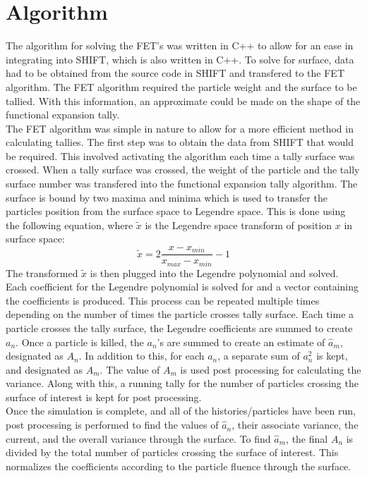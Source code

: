 \documentclass[10tma4paper]{article}
\begin{document}
\section{Algorithm}\label{algorith}
The algorithm for solving the FET's was written in C++ to allow for an ease in integrating into SHIFT, which is also written in C++. To solve for surface, data had to be obtained from the source code in SHIFT and transfered to the FET algorithm. The FET algorithm required the particle weight and the surface to be tallied. With this information, an approximate could be made on the shape of the functional expansion tally.
\\
The FET algorithm was simple in nature to allow for a more efficient method in calculating tallies. The first step was to obtain the data from SHIFT that would be required. This involved activating the algorithm each time a tally surface was crossed. When a tally surface was crossed, the weight of the particle and the tally surface number was transfered into the functional expansion tally algorithm. The surface is bound by two maxima and minima which is used to transfer the particles position from the surface space to Legendre space. This is done using the following equation, where $\tilde{x}$ is the Legendre space transform of position $x$ in surface space:
\begin{equation} \label{eq:8}
\tilde{x} = 2 \frac{x-x_{min}}{x_{max}-x_{min}} - 1
\end{equation}
The transformed $\tilde{x}$ is then plugged into the Legendre polynomial and solved. Each coefficient for the Legendre polynomial is solved for and a vector containing the coefficients is produced. This process can be repeated multiple times depending on the number of times the particle crosses tally surface. Each time a particle crosses the tally surface, the Legendre coefficients are summed to create $a_{n}$. Once a particle is killed, the $a_{n}$'s are summed to create an estimate of $\hat{a}_{m}$, designated as $A_{n}$. In addition to this, for each $a_{n}$, a separate sum of $a_{n}^{2}$ is kept, and designated as $A_{m}$. The value of $A_{m}$ is used post processing for calculating the variance. Along with this, a running tally for the number of particles crossing the surface of interest is kept for post processing.
\\
Once the simulation is complete, and all of the histories/particles have been run, post processing  is performed to find the values of $\hat{a}_{n}$, their associate variance, the current, and the overall variance through the surface. To find $\hat{a}_{m}$, the final $A_{n}$ is divided by the total number of particles crossing the surface of interest. This normalizes the coefficients according to the particle fluence through the surface. \\
\end{document}
